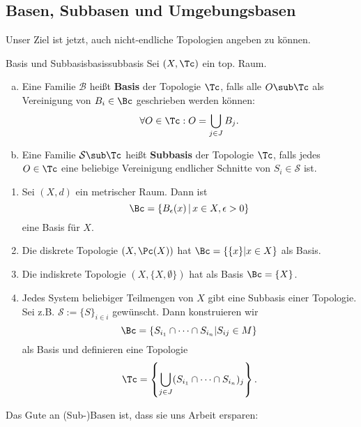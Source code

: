 \subsection{Basen, Subbasen und Umgebungsbasen}
\label{subsec:basen}
Unser Ziel ist jetzt, auch nicht-endliche Topologien angeben zu können.
\begin{definition}{Basis und Subbasis}{basissubbasis}
Sei $(X, \Tc)$ ein top. Raum.
\begin{enumerate}[(a)]
\item Eine Familie $\mathcal{B}$ heißt \textbf{Basis} der Topologie $\Tc$, falls alle $O \sub \Tc$ als Vereinigung von $B_i \in \Bc$ geschrieben werden können:
\begin{equation}
\forall O \in \Tc: O = \bigcup_{j \in J} B_j. 
\end{equation}
\item Eine Familie $\mathcal{S} \sub \Tc$ heißt \textbf{Subbasis} der Topologie $\Tc$, falls jedes $O \in \Tc$ eine beliebige Vereinigung endlicher Schnitte von $S_i \in \mathcal{S}$ ist.
\end{enumerate}
\end{definition}
\begin{beispiele}
\begin{enumerate}
\item Sei $(X,d)$ ein metrischer Raum. Dann ist 
\begin{equation}
\Bc = \{B_\epsilon(x) \, | \, x \in X, \epsilon > 0\}
\end{equation}
eine Basis für $X$.
\item Die diskrete Topologie $(X, \Pc(X))$ hat $\Bc = \{ \{x\} | x \in X\}$ als Basis. 
\item Die indiskrete Topologie $(X, \{X, \emptyset \})$ hat als Basis $\Bc = \{X\}$.
\item Jedes System beliebiger Teilmengen von $X$ gibt eine Subbasis einer Topologie. Sei z.B. $\mathcal{S} := \{S\}_{i\in i}$ gewünscht. Dann konstruieren wir 
\begin{equation}
\Bc = \{S_{i_1} \cap \dots \cap S_{i_n} | S_{ij} \in M\}
\end{equation} 
als Basis und definieren eine Topologie
\begin{equation}
\Tc = \left\{ \bigcup_{j \in J} (S_{i_1} \cap \cdots \cap S_{i_n})_j \right\}.
\end{equation}
\end{enumerate}
\end{beispiele}
Das Gute an (Sub-)Basen ist, dass sie uns Arbeit ersparen:
